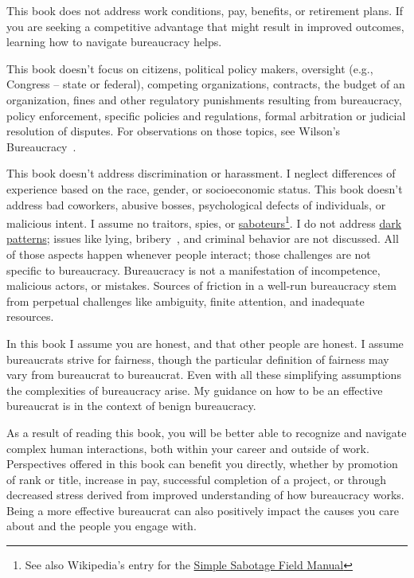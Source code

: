 This book does not address work conditions, pay, benefits, or retirement plans. If you are seeking a competitive advantage that might result in improved outcomes, learning how to navigate bureaucracy helps.


This book doesn't focus on citizens, political policy makers, oversight (e.g., Congress -- state or federal), competing organizations, contracts, the budget of an organization, fines and other regulatory punishments resulting from bureaucracy, policy enforcement, specific policies and regulations, formal arbitration or judicial resolution of disputes. For observations on those topics, see Wilson's Bureaucracy~\cite{1991_Wilson}. 


This book doesn't address discrimination or harassment. I neglect differences of experience based on the race, gender, or socioeconomic status. This book doesn't address bad coworkers, abusive bosses, psychological defects of individuals, or malicious intent. I assume no traitors, spies, or \href{https://www.hsdl.org/?abstract&did=750070}{saboteurs}\footnote{See also Wikipedia's entry for the \href{https://en.wikisource.org/wiki/Simple_Sabotage_Field_Manual}{Simple Sabotage Field Manual}
}.
I do not address \href{https://en.wikipedia.org/wiki/Dark_pattern}{dark patterns}; 
issues like lying, bribery~\cite{2021_Ang}, and criminal behavior are not discussed. All of those aspects happen whenever people interact; those challenges are not specific to bureaucracy. 
Bureaucracy is not a manifestation of incompetence, malicious actors, or mistakes. Sources of friction in a well-run bureaucracy stem from perpetual challenges like ambiguity, finite attention, and inadequate resources.


In this book I assume you are honest, and that other people are honest.  
I assume bureaucrats strive for fairness, though the particular definition of fairness may vary from bureaucrat to bureaucrat. 
Even with all these simplifying assumptions the complexities of bureaucracy arise. My guidance on how to be an effective bureaucrat is in the context of benign bureaucracy.


As a result of reading this book, you will be better able to recognize and navigate complex human interactions, both within your career and outside of work. Perspectives offered in this book can benefit you directly, whether by promotion of rank or title, increase in pay, successful completion of a project, or through decreased stress derived from improved understanding of how bureaucracy works. Being a more effective bureaucrat can also positively impact the causes you care about and the people you engage with.





